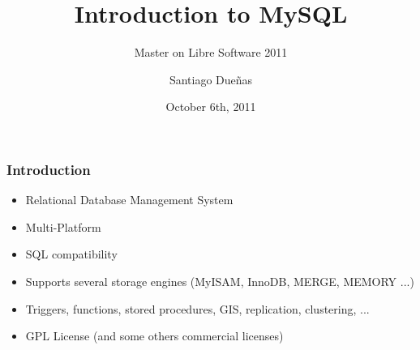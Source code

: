\documentclass{beamer}
\begin{document}
\title{Introduction to MySQL}
\subtitle{Master on Libre Software 2011}
\author{Santiago Dueñas} 
\date{October 6th, 2011}




\begin{frame}
\frametitle{Introduction}

\begin{itemize}
\item Relational Database Management System
\item Multi-Platform
\item SQL compatibility
\item Supports several storage engines (MyISAM, InnoDB, MERGE, MEMORY ...)
\item Triggers, functions, stored procedures, GIS, replication, clustering, ...
\item GPL License (and some others commercial licenses)
\end{itemize}

\end{frame}

\end{document}
